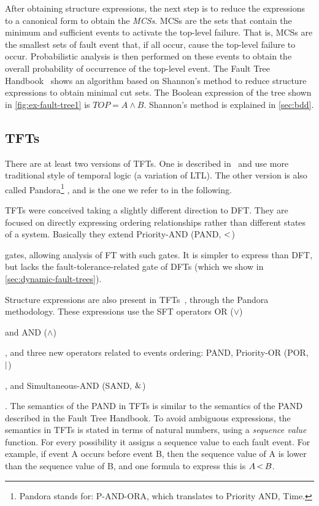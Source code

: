 \documentclass[en,twoside,onehalfspacing,phd]{risethesis}
\def\FThandbook{Fault Tree Handbook~\cite{VGR+1981}\index{Fault Tree!Handbook}%
  \gdef\FThandbook{Fault Tree Handbook\index{Fault Tree!Handbook}\xspace}%
  \xspace}
\def\pandora{Pandora\footnote{Pandora stands for: P-AND-ORA, which translates to Priority AND, Time.}%
  \gdef\pandora{Pandora\xspace}%
  \xspace}
\def\ortext{OR ($\lor$)%
  \gdef\ortext{OR\xspace}%
  \xspace
}
\def\andtext{AND ($\land$)%
  \gdef\andtext{AND\xspace}%
  \xspace
}
\def\pandtext{Priority-AND (PAND, $\pand$)%
  \gdef\pandtext{PAND\xspace}%
  \xspace
}
\def\portext{Priority-OR (POR, $\por$)%
  \gdef\portext{POR\xspace}%
  \xspace
}
\def\sandtext{Simultaneous-AND (SAND, $\sand$)%
  \gdef\sandtext{SAND\xspace}%
  \xspace
}
\def\pand{\ensuremath\operatorname{<}}
\def\por{\ensuremath\operatorname{|}}
\def\sand{\ensuremath\operatorname{\&}}
\begin{document}
After obtaining structure expressions, the next step is to reduce the expressions to a canonical form to obtain the \emph{\aclp{MCS}}.
\Acp{MCS} are the sets that contain the minimum and sufficient events to activate the top-level failure.
That is, \acp{MCS} are the smallest sets of fault event that, if all occur, cause the top-level failure to occur.
Probabilistic analysis is then performed on these events to obtain the overall probability of occurrence of the top-level event.
The \FThandbook shows an algorithm based on Shannon's method to reduce structure expressions to obtain minimal cut sets.
The Boolean expression of the tree shown in \cref{fig:ex-fault-tree1} is $TOP = A \wedge B$.
Shannon's method is explained in \cref{sec:bdd}.

\subsection{\Aclp{TFT}}
\label{sec:temporal-fault-trees}

There are at least two versions of \acp{TFT}.
One is described in~\cite{Palshikar2002} and use more traditional style of temporal logic (a variation of \ac{LTL}).
The other version is also called \pandora, and is the one we refer to in the following.

\Acp{TFT} were conceived taking a slightly different direction to \ac{DFT}.
They are focused on directly expressing ordering relationships rather than different states of a system. Basically they extend  \pandtext gates, allowing analysis of \ac{FT} with such gates.
It is simpler to express than \ac{DFT}, but lacks the fault-tolerance-related gate of \acp{DFT} (which we show in \cref{sec:dynamic-fault-trees}).

Structure expressions are also present in \acp{TFT}~\cite{WP2009,Walker2009,WP2010}, through the \pandora methodology.
These expressions use the \ac{SFT} operators \ortext and \andtext, and three new operators related to events ordering: \pandtext, \portext, and \sandtext.
The semantics of the \pandtext in \acp{TFT} is similar to the semantics of the \pandtext described in the \FThandbook.
To avoid ambiguous expressions, the semantics in \acp{TFT} is stated in terms of natural numbers, using a \emph{sequence value} function.
For every possibility it assigns a sequence value to each fault event.
For example, if event A occurs before event B, then the sequence value of A is lower than the sequence value of B, and one formula to express this is $A \pand B$.
\end{document}
